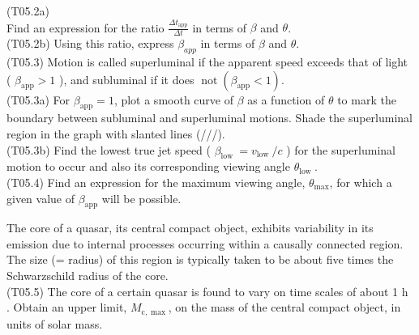 \documentclass[10pt]{article}
\begin{document}
    (T05.2a)\\
    Find an expression for the ratio $\frac{\Delta t_{\mathrm{app}}}{\Delta t}$ in terms of $\beta$ and $\theta$.\\
    (T05.2b) Using this ratio, express $\beta_{a p p}$ in terms of $\beta$ and $\theta$.\\
    (T05.3) Motion is called superluminal if the apparent speed exceeds that of light ( $\beta_{\mathrm{app}}>1$ ), and subluminal if it does $\operatorname{not}\left(\beta_{\mathrm{app}}<1\right)$.\\
    (T05.3a) For $\beta_{\mathrm{app}}=1$, plot a smooth curve of $\beta$ as a function of $\theta$ to mark the boundary between subluminal and superluminal motions. Shade the superluminal region in the graph with slanted lines (///).\\
    (T05.3b) Find the lowest true jet speed ( $\beta_{\text {low }}=v_{\text {low }} / c$ ) for the superluminal motion to occur and also its corresponding viewing angle $\theta_{\text {low }}$.\\
    (T05.4) Find an expression for the maximum viewing angle, $\theta_{\max }$, for which a given value of $\beta_{\mathrm{app}}$ will be possible.
    
    The core of a quasar, its central compact object, exhibits variability in its emission due to internal processes occurring within a causally connected region. The size (= radius) of this region is typically taken to be about five times the Schwarzschild radius of the core.\\
    (T05.5) The core of a certain quasar is found to vary on time scales of about 1 h . Obtain an upper limit, $M_{\mathrm{c}, \max }$, on the mass of the central compact object, in units of solar mass.
    
\end{document}
